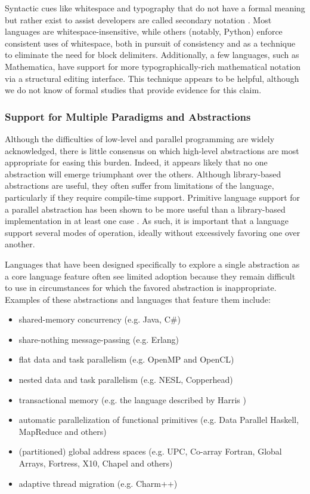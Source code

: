 \documentclass[12pt]{article}
\begin{document}
Syntactic cues like whitespace and typography that do not have a formal meaning but rather exist to assist developers are called secondary notation \cite{green1990programming}. Most languages are whitespace-insensitive, while others (notably, Python) enforce consistent uses of whitespace, both in pursuit of consistency and as a technique to eliminate the need for block delimiters. Additionally, a few languages, such as Mathematica, have support for more typographically-rich mathematical notation via a structural editing interface. This technique appears to be helpful, although we do not know of formal studies that provide evidence for this claim.

\subsubsection{Support for Multiple Paradigms and Abstractions}\label{multiparadigm}
Although the difficulties of low-level and parallel programming are widely acknowledged, there is little consensus on which high-level abstractions are most appropriate for easing this burden. Indeed, it appears likely that no one abstraction will emerge triumphant over the others. Although library-based abstractions are useful, they often suffer from limitations of the language, particularly if they require compile-time support. Primitive language support for a parallel abstraction has been shown to be more useful than a library-based implementation in at least one case \cite{cave2010comparing}. As such, it is important that a language support several modes of operation, ideally without excessively favoring one over another. 

Languages that have been designed specifically to explore a single abstraction as a core language feature often see limited adoption because they remain difficult to use in circumstances for which the favored abstraction is inappropriate. Examples of these abstractions and languages that feature them include: 

\begin{itemize}
\item shared-memory concurrency (e.g. Java, C\#)
\item share-nothing message-passing (e.g. Erlang)
\item flat data and task parallelism (e.g. OpenMP and  OpenCL)
\item nested data and task parallelism (e.g. NESL, Copperhead)
\item transactional memory (e.g. the language described by Harris \cite{harris2003language})
\item automatic parallelization of functional primitives (e.g. Data Parallel Haskell, MapReduce and others)
\item (partitioned) global address spaces (e.g. UPC, Co-array Fortran, Global Arrays, Fortress, X10, Chapel and others)
\item adaptive thread migration (e.g. Charm++)
\end{itemize}
\end{document}

